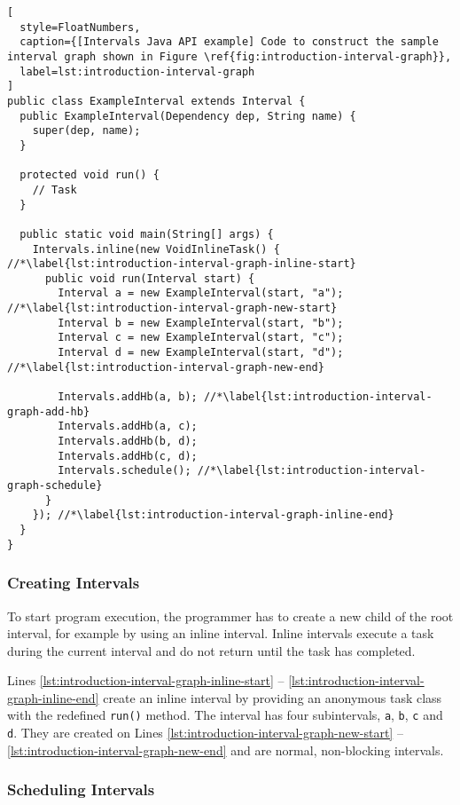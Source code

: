 \begin{lstlisting}[
  style=FloatNumbers, 
  caption={[Intervals Java API example] Code to construct the sample interval graph shown in Figure \ref{fig:introduction-interval-graph}},
  label=lst:introduction-interval-graph
]
public class ExampleInterval extends Interval {
  public ExampleInterval(Dependency dep, String name) {
    super(dep, name);
  }
  
  protected void run() {
    // Task
  }
  
  public static void main(String[] args) {
    Intervals.inline(new VoidInlineTask() { //*\label{lst:introduction-interval-graph-inline-start}
      public void run(Interval start) {
        Interval a = new ExampleInterval(start, "a"); //*\label{lst:introduction-interval-graph-new-start}
        Interval b = new ExampleInterval(start, "b");
        Interval c = new ExampleInterval(start, "c");
        Interval d = new ExampleInterval(start, "d"); //*\label{lst:introduction-interval-graph-new-end}
        
        Intervals.addHb(a, b); //*\label{lst:introduction-interval-graph-add-hb}
        Intervals.addHb(a, c);
        Intervals.addHb(b, d);
        Intervals.addHb(c, d);
        Intervals.schedule(); //*\label{lst:introduction-interval-graph-schedule}
      }
    }); //*\label{lst:introduction-interval-graph-inline-end}
  }
}
\end{lstlisting}

\subsubsection{Creating Intervals}
\label{sec:intro-intervals-creating-intervals}

To start program execution, the programmer has to create a new child
of the root interval, for example by using an inline interval. Inline
intervals execute a task during the current interval and do not return
until the task has completed.

Lines \ref{lst:introduction-interval-graph-inline-start} --
\ref{lst:introduction-interval-graph-inline-end} create an inline
interval by providing an anonymous task class with the redefined
\lstinline!run()!  method. The interval has four subintervals,
\lstinline!a!, \lstinline!b!, \lstinline!c! and \lstinline!d!. They
are created on Lines \ref{lst:introduction-interval-graph-new-start}
-- \ref{lst:introduction-interval-graph-new-end} and are normal,
non-blocking intervals.

\subsubsection{Scheduling Intervals}
\label{sec:intro-intervals-scheduling-intervals}

